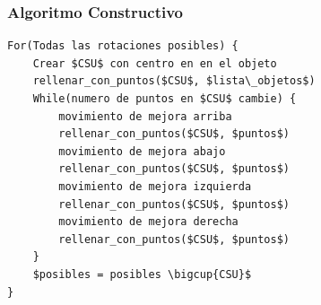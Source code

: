 \begin{frame}[fragile]
    \frametitle{Algoritmo Constructivo}
    \endblock{}
    \begin{lstlisting}[linewidth=\linewidth, mathescape,
    numbers=none,basicstyle=\ttfamily\footnotesize]
For(Todas las rotaciones posibles) {
    Crear $CSU$ con centro en en el objeto
    rellenar_con_puntos($CSU$, $lista\_objetos$)
    While(numero de puntos en $CSU$ cambie) {
        movimiento de mejora arriba
        rellenar_con_puntos($CSU$, $puntos$)
        movimiento de mejora abajo
        rellenar_con_puntos($CSU$, $puntos$)
        movimiento de mejora izquierda
        rellenar_con_puntos($CSU$, $puntos$)
        movimiento de mejora derecha
        rellenar_con_puntos($CSU$, $puntos$)
    }
    $posibles = posibles \bigcup{CSU}$
}
    \end{lstlisting}
\end{frame}

